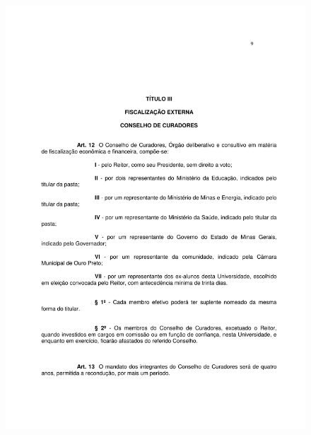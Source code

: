 \begin{figure}[p]
	\centering 
	\includegraphics[scale=0.7]{capitulos/resolucoes/cuni414/cuni414-9.pdf}
\end{figure}

